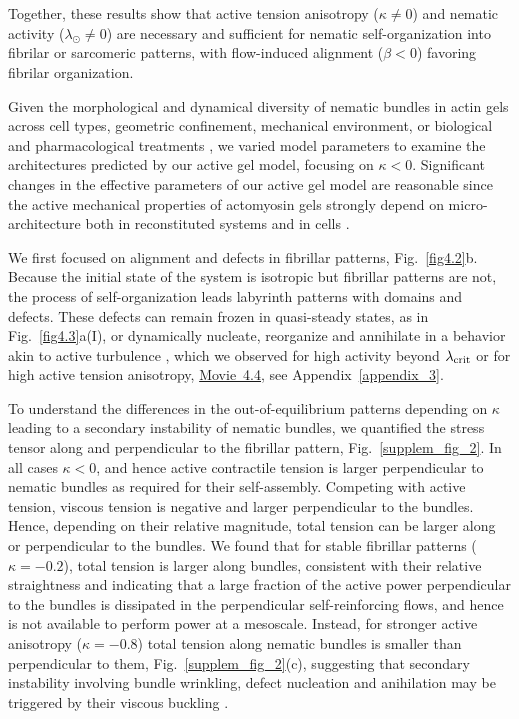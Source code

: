 Together, these results show that active tension anisotropy ($\kappa\ne0$) and nematic activity ($\lambda_\odot\ne 0$) are necessary and sufficient for nematic self-organization into fibrilar or sarcomeric patterns, with flow-induced alignment ($\beta<0$) favoring fibrilar organization. 

\medskip	
{} Given the morphological and dynamical diversity of nematic bundles in actin gels across cell types, geometric confinement, mechanical environment, or biological and pharmacological treatments \cite{yolland2019, jalal2019,dudin2019,gupta2015, xia2019, Verkhovsky1997}, we varied model parameters to examine the architectures predicted by our active gel model, focusing on $\kappa<0$. Significant changes in the effective parameters of our active gel model are reasonable since the active mechanical properties of actomyosin gels strongly depend on micro-architecture both in reconstituted systems and in cells \cite{Ennomani2016,chugh2017}.

We first focused on alignment and defects in fibrillar patterns, Fig.~\ref{fig4.2}b. Because the initial state of the system is isotropic but  fibrillar patterns are not, the process of self-organization leads labyrinth patterns with domains and defects. These defects can remain frozen in quasi-steady states, as in Fig.~\ref{fig4.3}a(I), or dynamically nucleate, reorganize and annihilate in a behavior akin to active turbulence \cite{alert2022}, which we observed for high activity beyond $\lambda_{\rm crit}$ or for high active tension anisotropy, \href{https://github.com/waleedmirzaPhD/movies_thesis.git}{Movie~4.4}, see Appendix~\ref{appendix_3}. 

To understand the differences in the out-of-equilibrium patterns depending on $\kappa$ leading to a secondary instability of nematic bundles, we quantified the stress tensor along and perpendicular to the fibrillar pattern, Fig.~\ref{supplem_fig_2}. 
In all cases $\kappa<0$, and hence active contractile tension is larger perpendicular to nematic bundles as required for their self-assembly. Competing with active tension, viscous tension is negative and larger perpendicular to the bundles. Hence, depending on their relative magnitude, total tension can be larger along or perpendicular to the bundles. We found that for stable fibrillar patterns ($\kappa = -0.2$), total tension is larger along bundles, consistent with their relative straightness and indicating that a large fraction of the active power perpendicular to the bundles is dissipated in the perpendicular self-reinforcing flows, and hence is not available to perform power at a mesoscale. Instead, for stronger active anisotropy ($\kappa = -0.8$) total tension along nematic bundles is smaller than perpendicular to them, Fig.~\ref{supplem_fig_2}(c), suggesting that secondary instability involving bundle wrinkling, defect nucleation and anihilation may be triggered by their viscous buckling \cite{PhysRevLett.109.064502}. 

